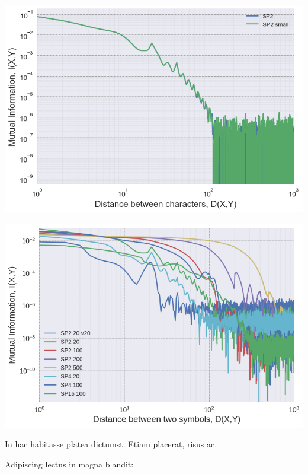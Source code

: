 \documentclass[a0,portrait]{a0poster}
\begin{document}
\begin{multicols}{2}
\begin{center}
\begin{minipage}[b]{0.45\linewidth}
\centering
\includegraphics[width=\textwidth]{spk_size.png}
\label{fig:spk_size}
\end{minipage}
\hspace{0.5cm}
\begin{minipage}[b]{0.45\linewidth}
\centering
\includegraphics[width=\textwidth]{spk_full.png}
\label{fig:spk_full}
\end{minipage}
\end{center}

In hac habitasse platea dictumst. Etiam placerat, risus ac.

Adipiscing lectus in magna blandit:


\end{multicols}
\end{document}
